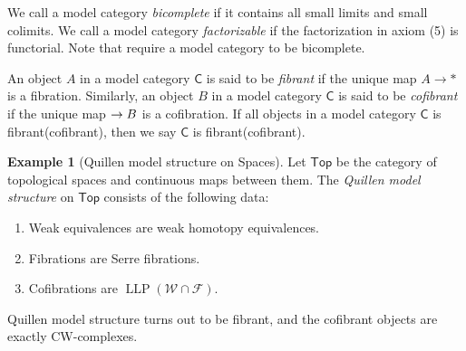 \documentclass[12pt]{amsart}
\theoremstyle{definition}
\newtheorem{example}[thm]{Example}
\theoremstyle{remark}
\numberwithin{equation}{section}
\newcommand{\CC}{{\mathsf C}}
\newcommand{\1}{{\mathbb{1}}}
\newcommand{\Top}{\mathsf{Top}}
\newcommand{\LLP}{\operatorname{LLP}}
\begin{document}
We call a model category {\it bicomplete} if it contains all small limits and small colimits. We call a model category {\it factorizable} if the factorization in axiom (5) is functorial. Note that \cite{Hov07} require a model category to be bicomplete. 

An object $A$ in a model category $\CC$ is said to be {\it fibrant} if the unique map $A\to *$ is a fibration. Similarly, an object $B$ in a model category $\CC$ is said to be {\it cofibrant} if the unique map $\empty \to B$ is a cofibration. If all objects in a model category $\CC$ is fibrant(cofibrant), then we say $\CC$ is fibrant(cofibrant).
\begin{example}[Quillen model structure on Spaces]
    Let $\Top$ be the category of topological spaces and continuous maps between them. The {\it Quillen model structure} on $\Top$ consists of the following data:
    \begin{enumerate}
        \item Weak equivalences are weak homotopy equivalences.
        \item Fibrations are Serre fibrations.
        \item Cofibrations are $\LLP(\mathcal{W}\cap \mathcal{F})$.
    \end{enumerate}
    Quillen model structure turns out to be fibrant, and the cofibrant objects are exactly CW-complexes.
\end{example}
\end{document}
